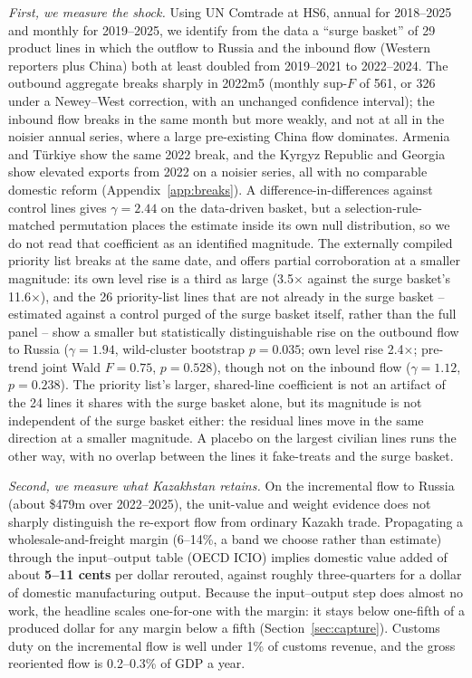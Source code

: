 \documentclass[12pt]{article}
\begin{document}
\emph{First, we measure the shock.} Using UN Comtrade at HS6, annual for 2018--2025 and
monthly for 2019--2025, we identify from the data a ``surge basket'' of 29 product lines in
which the outflow to Russia and the inbound flow (Western reporters plus China) both at least
doubled from 2019--2021 to 2022--2024. The outbound aggregate breaks sharply in 2022m5 (monthly
sup-$F$ of 561, or 326 under a Newey--West correction, with an unchanged confidence interval);
the inbound flow breaks in the same month but more weakly, and not at all in the noisier annual
series, where a large pre-existing China flow dominates. Armenia and T\"urkiye show the same
2022 break, and the Kyrgyz Republic and Georgia show elevated exports from 2022 on a noisier
series, all with no comparable domestic reform (Appendix~\ref{app:breaks}). A difference-in-differences against
control lines gives $\gamma = 2.44$ on the data-driven basket, but a selection-rule-matched
permutation places the estimate inside its own null distribution, so we do not read that
coefficient as an identified magnitude. The externally compiled priority list breaks at the
same date, and offers partial corroboration at a smaller magnitude: its own level rise is a
third as large (3.5$\times$ against the surge basket's 11.6$\times$), and the 26 priority-list
lines that are not already in the surge basket -- estimated against a control purged of the
surge basket itself, rather than the full panel -- show a smaller but statistically
distinguishable rise on the outbound flow to Russia ($\gamma = 1.94$, wild-cluster bootstrap
$p = 0.035$; own level rise 2.4$\times$; pre-trend joint Wald $F = 0.75$, $p = 0.528$), though
not on the inbound flow ($\gamma = 1.12$,
$p = 0.238$). The priority list's larger, shared-line coefficient is not an artifact of the 24
lines it shares with the surge basket alone, but its magnitude is not independent of the
surge basket either: the residual lines move in the same direction at a smaller magnitude.
A placebo on the largest civilian lines runs the other way, with no
overlap between the lines it fake-treats and the surge basket.

\emph{Second, we measure what Kazakhstan retains.} On the incremental flow to Russia (about
\$479m over 2022--2025), the unit-value and weight evidence does not sharply distinguish the
re-export flow from ordinary Kazakh trade. Propagating a wholesale-and-freight margin
(6--14\%, a band we choose rather than estimate) through the input--output table (OECD ICIO)
implies domestic value added of about \textbf{5--11 cents} per dollar rerouted, against roughly
three-quarters for a dollar of domestic manufacturing output. Because the input--output step
does almost no work, the headline scales one-for-one with the margin: it stays below one-fifth
of a produced dollar for any margin below a fifth (Section~\ref{sec:capture}). Customs duty
on the incremental flow is well under 1\% of customs revenue, and the gross reoriented flow is
0.2--0.3\% of GDP a year.
\end{document}
